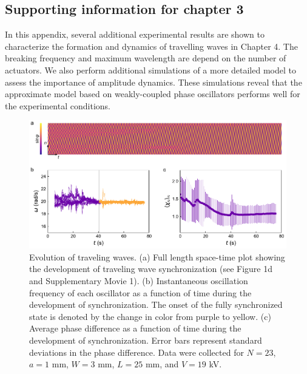 \begin{appendices}



\chapter{Supporting information for chapter 3}

In this appendix, several additional experimental results are shown to characterize the formation and dynamics of travelling waves in Chapter 4. The breaking frequency and maximum wavelength are depend on the number of actuators. We also perform additional simulations of a more detailed model to assess the importance  of  amplitude  dynamics.  These simulations  reveal  that  the  approximate  model  based  on  weakly-coupled  phase  oscillators performs well for the experimental conditions.

\begin{figure}[p]
    \centering
    \includegraphics{figures/A2_SI1-v3.pdf}
    \caption{Evolution of traveling waves. (a) Full length space-time plot showing the development of traveling wave synchronization (see Figure 1d and Supplementary Movie 1). (b) Instantaneous oscillation frequency of each oscillator as a function of time during the development of synchronization. The onset of the fully synchronized state is denoted by the change in color from purple to yellow. (c) Average phase difference as a function of time during the development of synchronization. Error bars represent standard deviations in the phase difference. Data were collected for $N=23$, $a=1$ mm, $W=3$ mm, $L=25$ mm, and $V=19$ kV.}
    \label{fig:SI1}
\end{figure}



\end{appendices}
